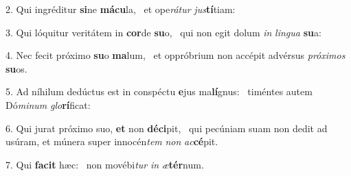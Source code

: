 2. Qui ingréditur \textbf{si}ne \textbf{má}\textbf{cu}la, \ast\  et ope\textit{rá}\textit{tur} \textit{jus}\textbf{tí}tiam:\

3. Qui lóquitur veritátem in \textbf{cor}de \textbf{su}o, \ast\  qui non egit dolum \textit{in} \textit{lin}\textit{gua} \textbf{su}a:\

4. Nec fecit próximo \textbf{su}o \textbf{ma}lum, \ast\  et oppróbrium non accépit advérsus \textit{pró}\textit{xi}\textit{mos} \textbf{su}os.\

5. Ad níhilum dedúctus est in conspéctu \textbf{e}jus ma\textbf{lí}gnus: \ast\  timéntes autem Dó\textit{mi}\textit{num} \textit{glo}\textbf{rí}ficat:\

6. Qui jurat próximo suo, \textbf{et} non \textbf{dé}\textbf{ci}pit, \ast\  qui pecúniam suam non dedit ad usúram, et múnera super innocén\textit{tem} \textit{non} \textit{ac}\textbf{cé}pit.\

7. Qui \textbf{fa}\textbf{cit} hæc: \ast\  non movébi\textit{tur} \textit{in} \textit{æ}\textbf{tér}num.\

